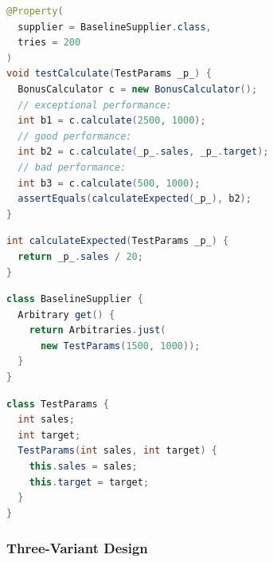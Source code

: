 {
\begin{genericfloat}[tb]
\newpage{}
\noindent
\begin{minipage}[t]{0.48\textwidth}

\begin{lstlisting}[language=Java, caption={Generalized test for the \textit{good performance} case.}, label=lst:generalized-test]
@Property(
  supplier = BaselineSupplier.class,
  tries = 200
)
void testCalculate(TestParams _p_) {
  BonusCalculator c = new BonusCalculator();
  // exceptional performance:
  int b1 = c.calculate(2500, 1000);
  // good performance:
  int b2 = c.calculate(_p_.sales, _p_.target);
  // bad performance:
  int b3 = c.calculate(500, 1000);
  assertEquals(calculateExpected(_p_), b2);
}
\end{lstlisting}

\begin{lstlisting}[language=Java, caption={Output oracle for the \textit{good performance} case.}, label=lst:java-output-encoding]
int calculateExpected(TestParams _p_) {
  return _p_.sales / 20;
}
\end{lstlisting}

\end{minipage}
\hfill
\begin{minipage}[t]{0.48\textwidth}

\begin{lstlisting}[language=Java, caption={\VariantBaseline{} supplier for \textit{good performance} inputs.
    The supplier uses the same inputs as the original test.
    }, label=lst:baseline-supplier]
class BaselineSupplier {
  Arbitrary get() {
    return Arbitraries.just(
      new TestParams(1500, 1000));
  }
}
\end{lstlisting}

\begin{lstlisting}[language=Java, caption={Container class for generated input values.}, label=lst:test-params-class]
class TestParams {
  int sales;
  int target;
  TestParams(int sales, int target) {
    this.sales = sales;
    this.target = target;
  }
}
\end{lstlisting}

\end{minipage}
\end{genericfloat}
}

\subsubsection{Three-Variant Design}
\label{sec:three-variant-design}

